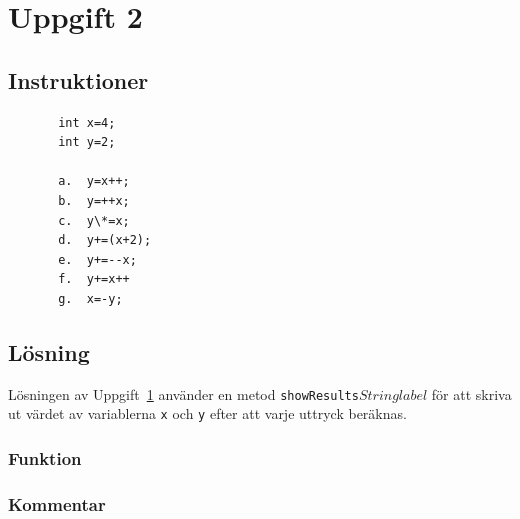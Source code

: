 \section{Uppgift 2}\label{sec:uppg02}

\subsection{Instruktioner}

\begin{verbatim}
       int x=4;
       int y=2;

       a.  y=x++;
       b.  y=++x;
       c.  y\*=x;
       d.  y+=(x+2);
       e.  y+=--x;
       f.  y+=x++
       g.  x=-y;
\end{verbatim}


\subsection{Lösning}
Lösningen av Uppgift~\ref{sec:uppg02} använder en metod
\texttt{showResults\(String label\)} för att skriva ut värdet av variablerna
\texttt{x} och \texttt{y} efter att varje uttryck beräknas.

\subsubsection{Funktion}

\subsubsection{Kommentar}

%


